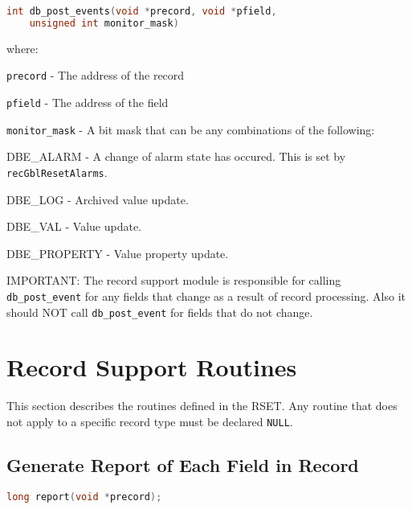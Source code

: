\begin{lstlisting}[language=C]
int db_post_events(void *precord, void *pfield,
    unsigned int monitor_mask)
\end{lstlisting}
where:
\begin{description}
\item \verb|precord| - The address of the record

\item \verb|pfield| - The address of the field

\item \verb|monitor_mask| - A bit mask that can be any combinations of the following:


\begin{description}

\item {}DBE\_ALARM - A change of alarm state has occured.
This is set by \verb|recGblResetAlarms|.

\item {}DBE\_LOG - Archived value update.

\item {}DBE\_VAL - Value update.

\item {}DBE\_PROPERTY - Value property update.

\end{description}

\end{description}
IMPORTANT:
The record support module is responsible for calling \verb|db_post_event| for any fields that change as a result of record processing.
Also it should NOT call \verb|db_post_event| for fields that do not change.

\section{Record Support Routines}

This section describes the routines defined in the RSET.
Any routine that does not apply to a specific record type must be declared \verb|NULL|.

\subsection{Generate Report of Each Field in Record}

\begin{lstlisting}[language=C]
long report(void *precord);
\end{lstlisting}

